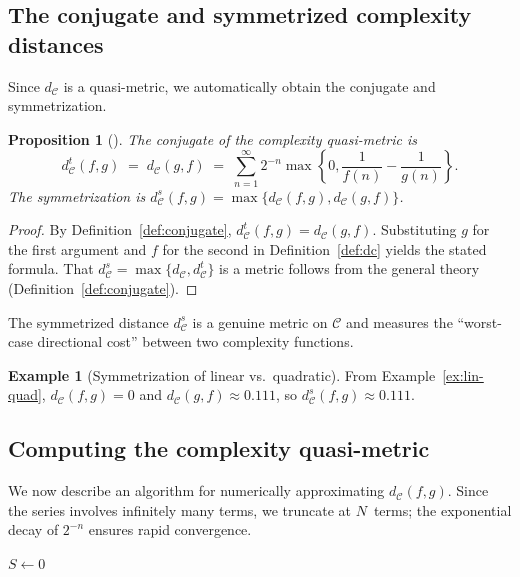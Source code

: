 \documentclass[11pt,a4paper]{article}
\theoremstyle{plain}
\newtheorem{propositioninner}[theoreminner]{Proposition}
\theoremstyle{definition}
\newtheorem{exampleinner}[theoreminner]{Example}
\newenvironment{proposition}[1][]{\begin{propositioninner}[#1]}{\end{propositioninner}}
\newenvironment{example}[1][]{\begin{exampleinner}[#1]}{\end{exampleinner}}
\newcommand{\C}{\mathcal{C}}
\begin{document}
\subsection{The conjugate and symmetrized complexity distances}

Since $d_\C$ is a quasi-metric, we automatically obtain the conjugate
and symmetrization.

\begin{proposition}\label{prop:conjugate-dc}
The conjugate of the complexity quasi-metric is
\[
  d_\C^t(f,g) \;=\; d_\C(g,f)
  \;=\; \sum_{n=1}^{\infty}2^{-n}\max\!\left\{0,\frac{1}{f(n)}-\frac{1}{g(n)}\right\}.
\]
The symmetrization is $d_\C^s(f,g)=\max\{d_\C(f,g),d_\C(g,f)\}$.
\end{proposition}

\begin{proof}
By Definition~\ref{def:conjugate}, $d_\C^t(f,g)=d_\C(g,f)$.
Substituting $g$ for the first argument and $f$ for the second
in Definition~\ref{def:dc} yields the stated formula.  That
$d_\C^s=\max\{d_\C,d_\C^t\}$ is a metric follows from the
general theory (Definition~\ref{def:conjugate}).
\end{proof}

The symmetrized distance $d_\C^s$ is a genuine metric on $\C$ and
measures the ``worst-case directional cost'' between two complexity
functions.

\begin{example}[Symmetrization of linear vs.\ quadratic]\label{ex:sym}
From Example~\ref{ex:lin-quad}, $d_\C(f,g)=0$ and
$d_\C(g,f)\approx 0.111$, so $d_\C^s(f,g)\approx 0.111$.
\end{example}


\subsection{Computing the complexity quasi-metric}

We now describe an algorithm for numerically approximating $d_\C(f,g)$.
Since the series involves infinitely many terms, we truncate at
$N$~terms; the exponential decay of $2^{-n}$ ensures rapid convergence.

\begin{algorithm}[H]
\DontPrintSemicolon
\SetAlgoLined
{}
\KwOut{Approximation of $d_\C(f,g)$}
$S \leftarrow 0$\;
\;
\caption{Compute $d_\C(f,g)$}
\label{alg:dc}
\end{algorithm}
\end{document}
